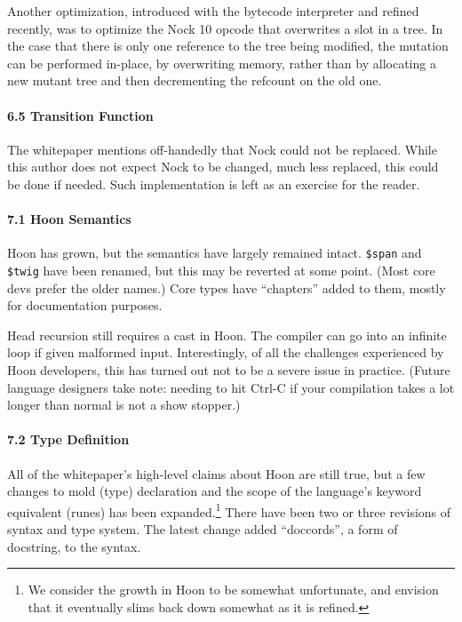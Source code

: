 \documentclass[twoside]{article}
\begin{document}
Another optimization, introduced with the bytecode interpreter and refined recently, was to optimize the Nock 10 opcode that overwrites a slot in a tree.  In the case that there is only one reference to the tree being modified, the mutation can be performed in-place, by overwriting memory, rather than by allocating a new mutant tree and then decrementing the refcount on the old one.

\paragraph{6.5 Transition Function}

The whitepaper mentions off-handedly that Nock could not be replaced.  While this author does not expect Nock to be changed, much less replaced, this could be done if needed.  Such implementation is left as an exercise for the reader.

\paragraph{7.1 Hoon Semantics}

Hoon has grown, but the semantics have largely remained intact.  \lstinline[style=inlinecode]{$span} and \lstinline[style=inlinecode]{$twig} have been renamed, but this may be reverted at some point.  (Most core devs prefer the older names.)  Core types have ``chapters'' added to them, mostly for documentation purposes.

Head recursion still requires a cast in Hoon.  The compiler can go into an infinite loop if given malformed input.  Interestingly, of all the challenges experienced by Hoon developers, this has turned out not to be a severe issue in practice.  (Future language designers take note:  needing to hit Ctrl-C if your compilation takes a lot longer than normal is not a show stopper.)

\paragraph{7.2 Type Definition}

All of the whitepaper's high-level claims about Hoon are still true, but a few changes to mold (type) declaration and the scope of the language's keyword equivalent (runes) has been expanded.\footnote{We consider the growth in Hoon to be somewhat unfortunate, and envision that it eventually slims back down somewhat as it is refined.}  There have been two or three revisions of syntax and type system.  The latest change added ``doccords'', a form of docstring, to the syntax.
\end{document}
